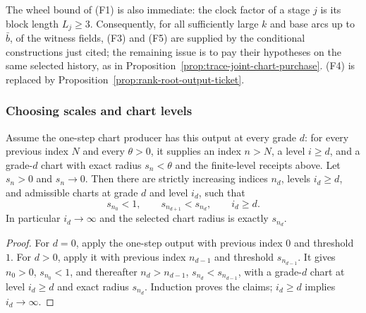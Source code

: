 The wheel bound of (F1) is also immediate: the clock factor of a stage
$j$ is its block length $L_j\ge3$. Consequently, for all sufficiently
large $k$ and base arcs up to $\bar b$, of the witness fields,
(F3) and (F5) are supplied by the conditional constructions just cited;
the remaining issue is to pay their hypotheses on the same selected
history, as in Proposition~\ref{prop:trace-joint-chart-purchase}. (F4) is replaced by
Proposition~\ref{prop:rank-root-output-ticket}.

\subsubsection{Choosing scales and chart levels}

\begin{lemma}
\label{lem:ex-lattice-firesky-selection}
Assume the one-step chart producer has this output at every grade $d$: for
every previous index $N$ and every $\theta>0$, it supplies an index $n>N$,
a level $i\geq d$, and a grade-$d$ chart with exact radius $s_n<\theta$
and the finite-level receipts above. Let $s_n>0$ and $s_n\to0$. Then
there are strictly increasing indices $n_d$, levels $i_d\geq d$, and
admissible charts at grade $d$ and level $i_d$, such that
\[
 s_{n_0}<1,\qquad s_{n_{d+1}}<s_{n_d},\qquad i_d\geq d.
\]
In particular $i_d\to\infty$ and the selected chart radius is exactly
$s_{n_d}$.
\end{lemma}
\begin{proof}
For $d=0$, apply the one-step output with previous index $0$ and threshold
$1$. For $d>0$, apply it with previous index $n_{d-1}$ and threshold
$s_{n_{d-1}}$. It gives $n_0>0$, $s_{n_0}<1$, and thereafter
$n_d>n_{d-1}$, $s_{n_d}<s_{n_{d-1}}$, with a grade-$d$ chart at level
$i_d\geq d$ and exact radius $s_{n_d}$. Induction proves the claims;
$i_d\geq d$ implies $i_d\to\infty$.
\end{proof}

